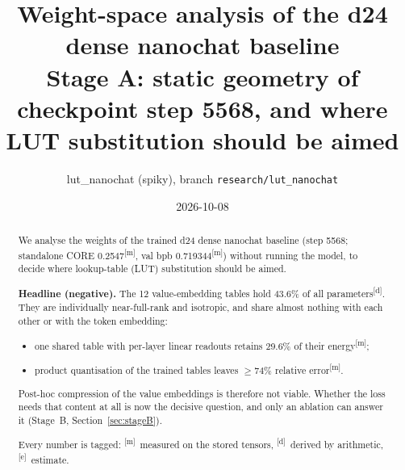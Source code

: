 \documentclass[11pt]{article}
\title{Weight-space analysis of the d24 dense nanochat baseline\\[2pt]
\large Stage A: static geometry of checkpoint step 5568, and where LUT substitution should be aimed}
\author{lut\_nanochat (spiky), branch \texttt{research/lut\_nanochat}}
\date{2026-10-08}
\newcommand{\meas}{\textsuperscript{[m]}}   %
\newcommand{\der}{\textsuperscript{[d]}}    %
\newcommand{\est}{\textsuperscript{[e]}}    %
\begin{document}
\maketitle

\begin{abstract}
We analyse the weights of the trained d24 dense nanochat baseline (step 5568; standalone CORE 0.2547\meas, val bpb 0.719344\meas) without running the model, to decide where lookup-table (LUT) substitution should be aimed.

\textbf{Headline (negative).} The 12 value-embedding tables hold 43.6\% of all parameters\der. They are individually near-full-rank and isotropic, and share almost nothing with each other or with the token embedding:
\begin{itemize}
\item one shared table with per-layer linear readouts retains 29.6\% of their energy\meas;
\item product quantisation of the trained tables leaves $\ge 74\%$ relative error\meas.
\end{itemize}
Post-hoc compression of the value embeddings is therefore not viable. Whether the loss needs that content at all is now the decisive question, and only an ablation can answer it (Stage~B, Section~\ref{sec:stageB}).

Every number is tagged: \meas\ measured on the stored tensors, \der\ derived by arithmetic, \est\ estimate.
\end{abstract}
\end{document}
